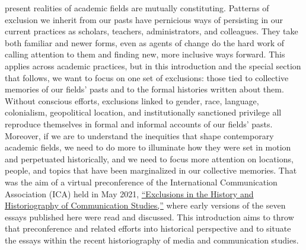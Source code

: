 \documentclass{tufte-handout}
\begin{document}
 present realities of academic fields are mutually
constituting. Patterns of exclusion we inherit from our pasts have
pernicious ways of persisting in our current practices as scholars,
teachers, administrators, and colleagues. They take both familiar and
newer forms, even as agents of change do the hard work of calling
attention to them and finding new, more inclusive ways forward. This
applies across academic practices, but in this introduction and the
special section that follows, we want to focus on one set of exclusions:
those tied to collective memories of our fields' pasts and to the formal
histories written about them. Without conscious efforts, exclusions
linked to gender, race, language, colonialism, geopolitical location,
and institutionally sanctioned privilege all reproduce themselves in
formal and informal accounts of our fields' pasts. Moreover, if we are
to understand the inequities that shape contemporary academic fields, we
need to do more to illuminate how they were set in motion and
perpetuated historically, and we need to focus more attention on
locations, people, and topics that have been marginalized in our
collective memories. That was the aim of a virtual preconference of the
International Communication Association (ICA) held in May 2021,
\href{https://hms.mediastudies.press/pub/schedule/release/12}{``Exclusions
in the History and Historiography of Communication Studies,''} where
early versions of the seven essays published here were read and
discussed. This introduction aims to throw that preconference and
related efforts into historical perspective and to situate the essays
within the recent historiography of media and communication studies.
\end{document}
